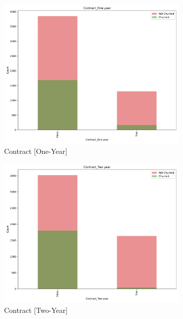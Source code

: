 \documentclass[a4paper,11pt]{article}
\begin{document}
\begin{landscape}
\begin{figure}
\begin{subfigure}{0.14\linewidth}
        \includegraphics[width=\linewidth]{figures/understanding/Contract_One year.pdf}
        \caption{Contract [One-Year]}
    \end{subfigure}
    \begin{subfigure}{0.14\linewidth}
        \includegraphics[width=\linewidth]{figures/understanding/Contract_Two year.pdf} 
        \caption{Contract [Two-Year]}
    \end{subfigure}
    \begin{subfigure}{0.14\linewidth}

\end{subfigure}
\end{figure}
\end{landscape}
\end{document}
